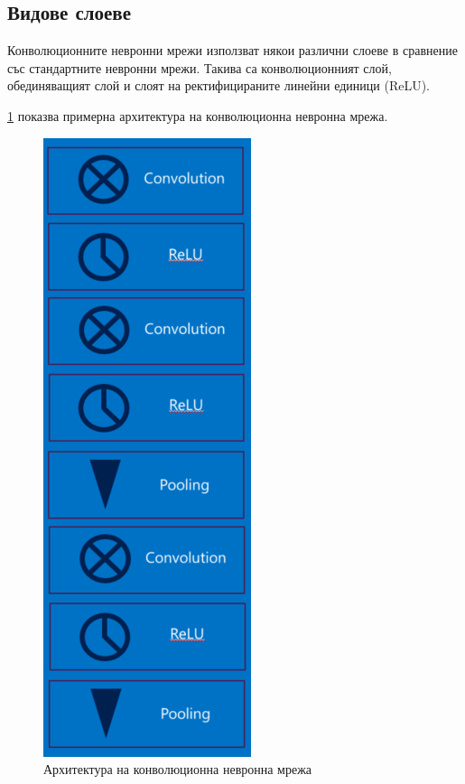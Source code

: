 \subsection{Видове слоеве}
Конволюционните невронни мрежи използват някои различни слоеве в сравнение със стандартните невронни мрежи. Такива са конволюционният слой, обединяващият слой и слоят на ректифицираните линейни единици (ReLU).

\ref{fig:ConvNeuralNetwork} показва примерна архитектура на конволюционна невронна мрежа.

\begin{figure}[H]
\centering
\includegraphics{Figures/cnn12.png}
\caption{Архитектура на конволюционна невронна мрежа \cite{CNN_blog}}
\label{fig:ConvNeuralNetwork}
\end{figure}

